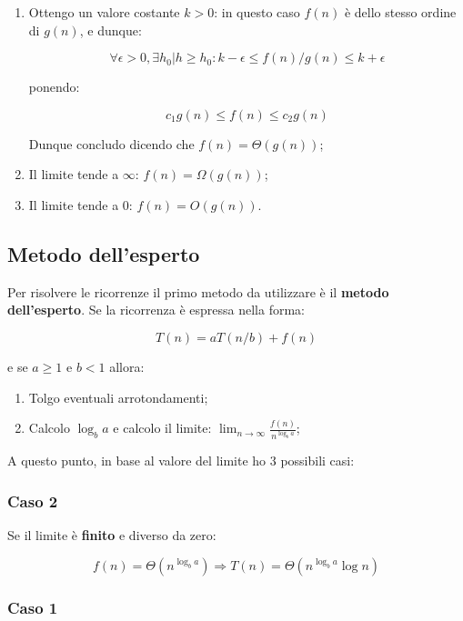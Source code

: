\begin{enumerate}

\item Ottengo un valore costante $k>0$: in questo caso $f(n)$ è dello stesso ordine di $g(n)$, e dunque:

$$\forall \epsilon>0, \exists h_0 | h\ge h_0 : k-\epsilon \le f(n)/g(n)\le k+\epsilon$$

ponendo:

$$c_1g(n)\le f(n) \le c_2g(n)$$

Dunque concludo dicendo che $f(n)=\Theta(g(n))$;

\item Il limite tende a $\infty$: $f(n)=\Omega(g(n))$;
\item Il limite tende a $0$: $f(n)=O(g(n))$.

\end{enumerate}

\subsection{Metodo dell'esperto}

Per risolvere le ricorrenze il primo metodo da utilizzare è il \textbf{metodo dell'esperto}. Se la ricorrenza è espressa nella forma:

$$T(n)=aT(n/b)+f(n)$$

e se $a \ge 1$ e $b<1$ allora:

\begin{enumerate}

\item Tolgo eventuali arrotondamenti;
\item Calcolo $\log_ba$ e calcolo il limite: $\lim_{n \to \infty}\frac{f(n)}{n^{\log_ba}}$;

\end{enumerate}

A questo punto, in base al valore del limite ho 3 possibili casi:

\subsubsection{Caso 2}

Se il limite è \textbf{finito} e diverso da zero:

$$f(n)=\Theta(n^{\log_ba})\Rightarrow T(n)=\Theta(n^{\log_ba}\log n)$$

\subsubsection{Caso 1}

